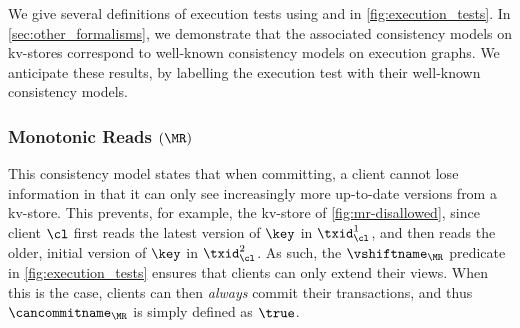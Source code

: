 %

We give several definitions of
execution tests using \vshiftname and \cancommitname in \cref{fig:execution_tests}. 
In \cref{sec:other_formalisms}, we demonstrate that the associated consistency
models on kv-stores correspond to well-known consistency models on 
execution graphs. We anticipate these results, by labelling the
execution test with their well-known consistency models.


\subsubsection{Monotonic Reads $(\MR)$}
This consistency model states that when committing, a client
cannot lose information in that it can only see increasingly more up-to-date versions from a kv-store.
This prevents, for example, the kv-store of \cref{fig:mr-disallowed},
since client $\cl$ first reads the latest version of $\key$ in $\txid_{\cl}^{1}$, 
and then reads the older, initial version of $\key$ in $\txid_{\cl}^{2}$.  
As such, the $\vshiftname_{\MR}$ predicate in \cref{fig:execution_tests} ensures that clients  can only extend their views. 
When this is the case, clients can then \emph{always} commit their transactions, and thus $\cancommitname_{\MR}$ is simply defined as $\true$. 
%
%

